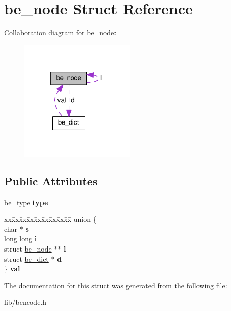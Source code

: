 \hypertarget{structbe__node}{}\section{be\+\_\+node Struct Reference}
\label{structbe__node}


Collaboration diagram for be\+\_\+node\+:\nopagebreak
\begin{figure}[H]
\begin{center}
\leavevmode
\includegraphics[width=157pt]{structbe__node__coll__graph}
\end{center}
\end{figure}
\subsection*{Public Attributes}
\begin{DoxyCompactItemize}
\item 
\mbox{\label{structbe__node_a88d2500935e80562cd0ec9bf5a88ed45}} 
be\+\_\+type {\bfseries type}
\item 
\mbox{\label{structbe__node_af6e101f7301823d24fcda7a3e8be7e7d}} 
\begin{tabbing}
xx\=xx\=xx\=xx\=xx\=xx\=xx\=xx\=xx\=\kill
union \{\\
\>char $\ast$ {\bfseries s}\\
\>long long {\bfseries i}\\
\>struct \hyperlink{structbe__node}{be\_node} $\ast$$\ast$ {\bfseries l}\\
\>struct \hyperlink{structbe__dict}{be\_dict} $\ast$ {\bfseries d}\\
\} {\bfseries val}\\

\end{tabbing}\end{DoxyCompactItemize}


The documentation for this struct was generated from the following file\+:\begin{DoxyCompactItemize}
\item 
lib/bencode.\+h\end{DoxyCompactItemize}

